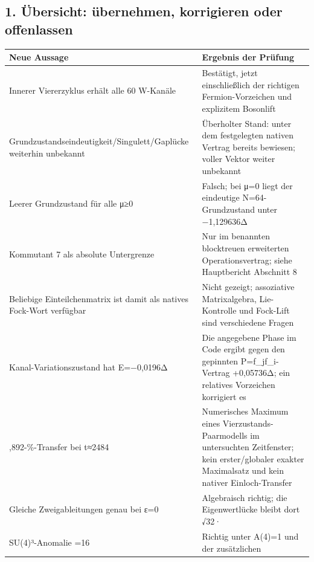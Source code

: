 \subsection{1. Übersicht: übernehmen, korrigieren oder
offenlassen}\label{uxfcbersicht-uxfcbernehmen-korrigieren-oder-offenlassen}

{\def\LTcaptype{none} %
\begin{longtable}[]{@{}
  >{\raggedright\arraybackslash}p{}
  >{\raggedright\arraybackslash}p{}@{}}
\toprule\noalign{}
\begin{minipage}[b]{\linewidth}\raggedright
Neue Aussage
\end{minipage} & \begin{minipage}[b]{\linewidth}\raggedright
Ergebnis der Prüfung
\end{minipage} \\
\midrule\noalign{}
\endhead
\bottomrule\noalign{}
\endlastfoot
Innerer Viererzyklus erhält alle 60 W-Kanäle & Bestätigt, jetzt
einschließlich der richtigen Fermion-Vorzeichen und explizitem
Bosonlift \\
Grundzustandseindeutigkeit/Singulett/Gaplücke weiterhin unbekannt &
Überholter Stand: unter dem festgelegten nativen Vertrag bereits
bewiesen; voller Vektor weiter unbekannt \\
Leerer Grundzustand für alle μ≥0 & Falsch; bei μ=0 liegt der eindeutige
N=64-Grundzustand unter −1,129636Δ \\
Kommutant 7 als absolute Untergrenze & Nur im benannten blocktreuen
erweiterten Operationsvertrag; siehe Hauptbericht Abschnitt 8 \\
Beliebige Einteilchenmatrix ist damit als natives Fock-Wort verfügbar &
Nicht gezeigt; assoziative Matrixalgebra, Lie-Kontrolle und Fock-Lift
sind verschiedene Fragen \\
Kanal-Variationszustand hat E=−0,0196Δ & Die angegebene Phase im Code
ergibt gegen den gepinnten P=f\_jf\_i-Vertrag +0,05736Δ; ein relatives
Vorzeichen korrigiert es \\
99,892-\%-Transfer bei t≈2484 & Numerisches Maximum eines
Vierzustands-Paarmodells im untersuchten Zeitfenster; kein
erster/globaler exakter Maximalsatz und kein nativer Einloch-Transfer \\
Gleiche Zweigableitungen genau bei ε=0 & Algebraisch richtig; die
Eigenwertlücke bleibt dort √32· \\
SU(4)³-Anomalie =16 & Richtig unter A(4)=1 und der zusätzlichen

\end{longtable}}
